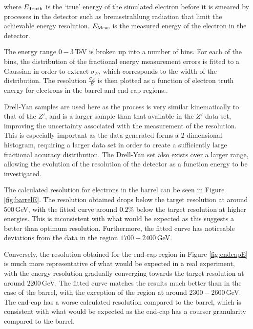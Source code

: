 \documentclass{article}
\begin{document}
where $E_{\rm{Truth}}$ is the `true' energy of the simulated electron before it is smeared by processes in the detector such as bremsstrahlung radiation that limit the achievable energy resolution. $E_{\rm{Meas}}$ is the measured energy of the electron in the detector. 

The energy range $0-3\,$TeV is broken up into a number of bins. For each of the bins, the distribution of the fractional energy measurement errors is fitted to a Gaussian in order to extract $\sigma_E$, which corresponds to the width of the distribution. The resolution $\frac{\sigma_E}{E}$ is then plotted as a function of electron truth energy for electrons in the barrel and end-cap regions.. 


Drell-Yan samples are used here as the process is very similar kinematically to that of the $Z'$, and is a larger sample than that available in the $Z'$ data set, improving the uncertainty associated with the measurement of the resolution. This is especially important as the data generated forms a 2-dimensional histogram, requiring a larger data set in order to create a sufficiently large fractional accuracy distribution. The Drell-Yan set also exists over a larger range, allowing the evolution of the resolution of the detector as a function energy to be investigated.

The calculated resolution for electrons in the barrel can be seen in Figure \ref{fig:barrelE}. The resolution obtained drops below the target resolution at around $500\,$GeV, with the fitted curve around $0.2\%$ below the target resolution at higher energies. This is inconsistent with what would be expected as this suggests a better than optimum resolution. Furthermore, the fitted curve has noticeable deviations from the data in the region $1700-2400\,$GeV. 

Conversely, the resolution obtained for the end-cap region in Figure \ref{fig:endcapE} is much more representative of what would be expected in a real experiment, with the energy resolution gradually converging towards the target resolution at around $2200\,$GeV. The fitted curve matches the results much better than in the case of the barrel, with the exception of the region at around $2300-2600\,$GeV. The end-cap has a worse calculated resolution compared to the barrel, which is consistent with what would be expected as the end-cap has a courser granularity compared to the barrel.
\end{document}

